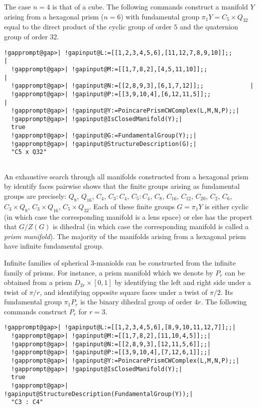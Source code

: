 \documentclass[a4paper,11pt]{report}
\begin{document}
{{  

The case $n=4$ is that of a cube. The following commands construct a manifold $Y$ arising from a hexagonal prism ($n=6$) with fundamental group $\pi_1Y=C_5\times Q_{32}$ equal to the direct product of the cyclic group of order $5$ and the quaternion group of order $32$. 
\begin{Verbatim}[commandchars=!@|,fontsize=\small,frame=single,label=Example]
  !gapprompt@gap>| !gapinput@L:=[[1,2,3,4,5,6],[11,12,7,8,9,10]];;                 |
  !gapprompt@gap>| !gapinput@M:=[[1,7,8,2],[4,5,11,10]];;             |
  !gapprompt@gap>| !gapinput@N:=[[2,8,9,3],[6,1,7,12]];;             |
  !gapprompt@gap>| !gapinput@P:=[[3,9,10,4],[6,12,11,5]];;             |
  !gapprompt@gap>| !gapinput@Y:=PoincarePrismCWComplex(L,M,N,P);;|
  !gapprompt@gap>| !gapinput@IsClosedManifold(Y);|
  true
  !gapprompt@gap>| !gapinput@G:=FundamentalGroup(Y);;|
  !gapprompt@gap>| !gapinput@StructureDescription(G);|
  "C5 x Q32"
  
\end{Verbatim}
 

An exhaustive search through all manifolds constructed from a hexagonal prism
by identify faces pairwise shows that the finite groups arising as fundamental
groups are precisely: $ Q_8$, $Q_{16}$, $C_4$, $ C_3 : C_4$, $ C_5 : C_4$, $ C_8$, $C_{16}$, $C_{12}$, $C_{20}$, $C_2$, $ C_6$, $ C_3 \times Q_8$, $ C_3 \times Q_{16}$, $C_5 \times Q_{32} $. Each of these finite groups $G=\pi_1Y$ is either cyclic (in which case the corresponding manifold is a lens space) or
else has the propert that $G/Z(G)$ is dihedral (in which case the corresponding manifold is called a \emph{prism manifold}). The majority of the manifolds arising from a hexagonal prism have infinite
fundamental group. 

 Infinite families of spherical $3$-maniolds can be constructed from the infinite family of prisms. For instance,
a prism manifold which we denote by $P_r$ can be obtained from a prism $D_{2r}\times [0,1]$ by identifying the left and right side under a twist of $\pi/r$, and identifying opposite square faces under a twist of $\pi/2$. Its fundamental group $\pi_1P_r$ is the binary dihedral group of order $4r$. The following commands construct $P_r$ for $r=3$. 
\begin{Verbatim}[commandchars=!@|,fontsize=\small,frame=single,label=Example]
  !gapprompt@gap>| !gapinput@L:=[[1,2,3,4,5,6],[8,9,10,11,12,7]];;|
  !gapprompt@gap>| !gapinput@M:=[[1,7,8,2],[11,10,4,5]];;|
  !gapprompt@gap>| !gapinput@N:=[[2,8,9,3],[12,11,5,6]];;|
  !gapprompt@gap>| !gapinput@P:=[[3,9,10,4],[7,12,6,1]];;|
  !gapprompt@gap>| !gapinput@Y:=PoincarePrismCWComplex(L,M,N,P);;|
  !gapprompt@gap>| !gapinput@IsClosedManifold(Y);|
  true
  !gapprompt@gap>| !gapinput@StructureDescription(FundamentalGroup(Y));|
  "C3 : C4"
  

\end{Verbatim}}}
\end{document}
